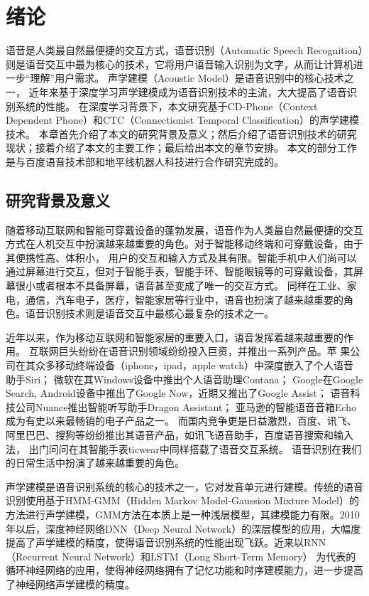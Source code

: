 \chapter{绪论}

语音是人类最自然最便捷的交互方式，语音识别（Automatic Speech Recognition）则是语音交互中最为核心的技术，它将用户语音输入识别为文字，从而让计算机进一步“理解”用户需求。
声学建模（Acoustic Model）是语音识别中的核心技术之一，
近年来基于深度学习声学建模成为语音识别技术的主流，大大提高了语音识别系统的性能。
在深度学习背景下，本文研究基于CD-Phone（Context Dependent Phone）和CTC（Connectionist  Temporal Classification）的声学建模技术。
本章首先介绍了本文的研究背景及意义；然后介绍了语音识别技术的研究现状；接着介绍了本文的主要工作；最后给出本文的章节安排。
本文的部分工作是与百度语音技术部和地平线机器人科技进行合作研究完成的。

\section{研究背景及意义}

随着移动互联网和智能可穿戴设备的蓬勃发展，语音作为人类最自然最便捷的交互方式在人机交互中扮演越来越重要的角色。对于智能移动终端和可穿戴设备，由于其便携性高、体积小，
用户的交互和输入方式及其有限。智能手机中人们尚可以通过屏幕进行交互，但对于智能手表，智能手环、智能眼镜等的可穿戴设备，其屏幕很小或者根本不具备屏幕，语音甚至变成了唯一的交互方式。
同样在工业、家电，通信，汽车电子，医疗，智能家居等行业中，语音也扮演了越来越重要的角色。语音识别技术则是语音交互中最核心最复杂的技术之一。

近年以来，作为移动互联网和智能家居的重要入口，语音发挥着越来越重要的作用。
互联网巨头纷纷在语音识别领域纷纷投入巨资，并推出一系列产品。苹
果公司在其众多移动终端设备（iphone，ipad，apple watch）中深度嵌入了个人语音助手Siri；
微软在其Windows设备中推出个人语音助理Contana；
Google在Google Search, Android设备中推出了Google Now，近期又推出了Google Assist；
语音科技公司Nuance推出智能听写助手Dragon Assistant；
亚马逊的智能语音音箱Echo成为有史以来最畅销的电子产品之一。
而国内竞争更是日益激烈，百度、讯飞、阿里巴巴、搜狗等纷纷推出其语音产品，如讯飞语音助手，百度语音搜索和输入法，
出门问问在其智能手表ticwear中同样搭载了语音交互系统。
语音识别在我们的日常生活中扮演了越来越重要的角色。

声学建模是语音识别系统的核心的技术之一，它对发音单元进行建模。传统的语音识别使用基于HMM-GMM（Hidden Markov Model-Gaussion Mixture Model）的方法进行声学建模，GMM方法在本质上是一种浅层模型，其建模能力有限。2010年以后，深度神经网络DNN（Deep Neural Network）的深层模型的应用，大幅度提高了声学建模的精度，使得语音识别系统的性能出现飞跃。近来以RNN（Recurrent Neural Network）和LSTM（Long Short-Term Memory）
为代表的循环神经网络的应用，使得神经网络拥有了记忆功能和时序建模能力，进一步提高了神经网络声学建模的精度。

